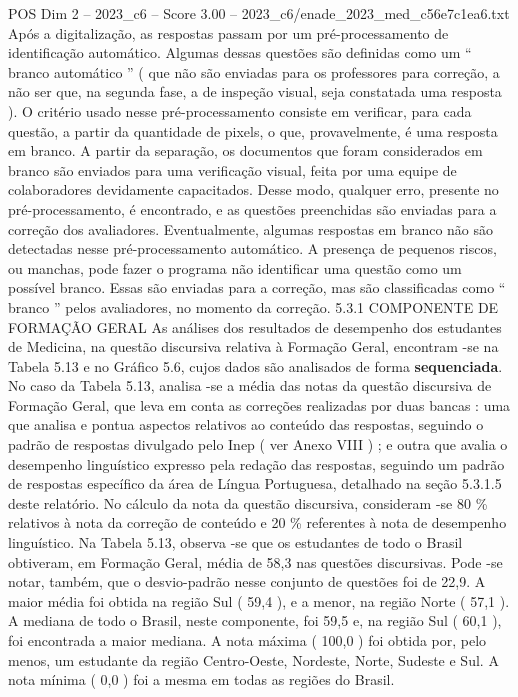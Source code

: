 \begin{textsample}{POS Dim 2 – 2023\_c6 – Score 3.00 – 2023\_c6/enade\_2023\_med\_c56e7c1ea6.txt}
Após a digitalização, as respostas passam por um pré-processamento de identificação automático.
Algumas dessas questões são definidas como um “ branco automático ” ( que não são enviadas para os professores para correção, a não ser que, na segunda fase, a de inspeção visual, seja constatada uma resposta ).
O critério usado nesse pré-processamento consiste em verificar, para cada questão, a partir da quantidade de pixels, o que, provavelmente, é uma resposta em branco.
A partir da separação, os documentos que foram considerados em branco são enviados para uma verificação visual, feita por uma equipe de colaboradores devidamente capacitados.
Desse modo, qualquer erro, presente no pré-processamento, é encontrado, e as questões preenchidas são enviadas para a correção dos avaliadores.
Eventualmente, algumas respostas em branco não são detectadas nesse pré-processamento automático.
A presença de pequenos riscos, ou manchas, pode fazer o programa não identificar uma questão como um possível branco.
Essas são enviadas para a correção, mas são classificadas como “ branco ” pelos avaliadores, no momento da correção. 5.3.1 COMPONENTE DE FORMAÇÃO GERAL As análises dos resultados de desempenho dos estudantes de Medicina, na questão discursiva relativa à Formação Geral, encontram -se na Tabela 5.13 e no Gráfico 5.6, cujos dados são analisados de forma \textbf{sequenciada}.
No caso da Tabela 5.13, analisa -se a média das notas da questão discursiva de Formação Geral, que leva em conta as correções realizadas por duas bancas : uma que analisa e pontua aspectos relativos ao conteúdo das respostas, seguindo o padrão de respostas divulgado pelo Inep ( ver Anexo VIII ) ; e outra que avalia o desempenho linguístico expresso pela redação das respostas, seguindo um padrão de respostas específico da área de Língua Portuguesa, detalhado na seção 5.3.1.5 deste relatório.
No cálculo da nota da questão discursiva, consideram -se 80 \% relativos à nota da correção de conteúdo e 20 \% referentes à nota de desempenho linguístico.
Na Tabela 5.13, observa -se que os estudantes de todo o Brasil obtiveram, em Formação Geral, média de 58,3 nas questões discursivas.
Pode -se notar, também, que o desvio-padrão nesse conjunto de questões foi de 22,9.
A maior média foi obtida na região Sul ( 59,4 ), e a menor, na região Norte ( 57,1 ).
A mediana de todo o Brasil, neste componente, foi 59,5 e, na região Sul ( 60,1 ), foi encontrada a maior mediana.
A nota máxima ( 100,0 ) foi obtida por, pelo menos, um estudante da região Centro-Oeste, Nordeste, Norte, Sudeste e Sul.
A nota mínima ( 0,0 ) foi a mesma em todas as regiões do Brasil.

\end{textsample}
